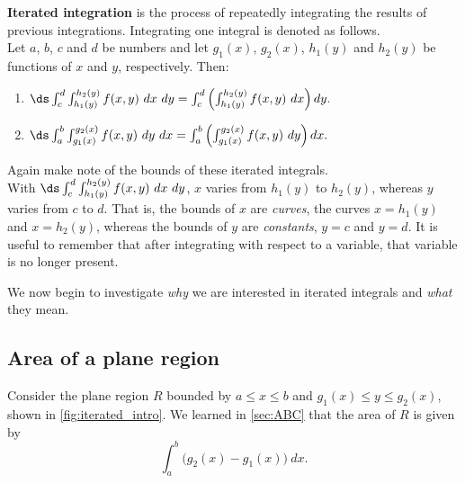 {\textbf{Iterated integration} is the process of repeatedly integrating the results of previous integrations. Integrating one integral is denoted as follows.\\

Let $a$, $b$, $c$ and $d$ be numbers and let $g_1(x)$, $g_2(x)$, $h_1(y)$ and $h_2(y)$ be functions of $x$ and $y$, respectively. Then:
\begin{enumerate}
	\item $\ds \int_c^d\int_{h_1(y)}^{h_2(y)} f(x,y)\ dx\ dy = \int_c^d\left(\int_{h_1(y)}^{h_2(y)} f(x,y)\ dx\right) dy.$
	\item $\ds \int_a^b\int_{g_1(x)}^{g_2(x)} f(x,y)\ dy\ dx = \int_a^b\left(\int_{g_1(x)}^{g_2(x)} f(x,y)\ dy\right) dx.$
\end{enumerate}}

Again make note of the bounds of these iterated integrals.\\
With $\ds \int_c^d\int_{h_1(y)}^{h_2(y)} f(x,y)\ dx\ dy$, $x$ varies from $h_1(y)$ to $h_2(y)$, whereas $y$ varies from $c$ to $d$. That is, the bounds of $x$ are \textit{curves}, the curves $x=h_1(y)$ and $x=h_2(y)$, whereas the bounds of $y$ are \textit{constants}, $y=c$ and $y=d$. It is useful to remember that
after integrating with respect to a variable, that variable is no longer present.

We now begin to investigate \textit{why} we are interested in iterated integrals and \textit{what} they mean.

\subsection{Area of a plane region}

Consider the plane region $R$ bounded by $a\leq x\leq b$ and $g_1(x)\leq y\leq g_2(x)$, shown in \autoref{fig:iterated_intro}. We learned in \autoref{sec:ABC} that the area of $R$ is given by 
\[\int_a^b \big(g_2(x)-g_1(x)\big)\ dx.\]

